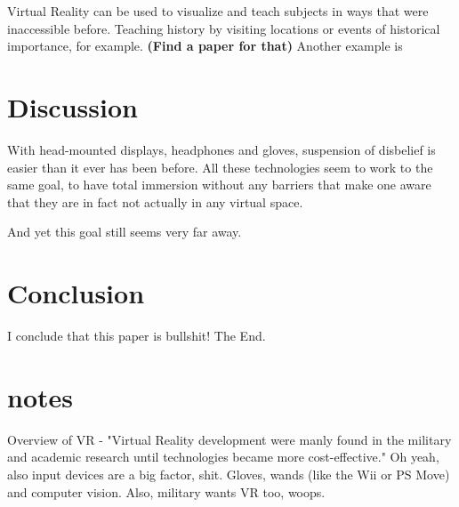 \documentclass[11pt]{article}
\begin{document}
	Virtual Reality can be used to visualize and teach subjects in ways that were inaccessible before. Teaching history by visiting locations or events of historical importance, for example. \textbf{(Find a paper for that)}
	Another example is 


	
	
	
	


\section{Discussion}
With head-mounted displays, headphones and gloves, suspension of disbelief is easier than it ever has been before. All these technologies seem to work to the same goal, to have total immersion without any barriers that make one aware that they are in fact not actually in any virtual space.

And yet this goal still seems very far away.


\section{Conclusion}
I conclude that this paper is bullshit! The End.




\section{notes}
Overview of VR - "Virtual Reality development were manly found in the military and academic research until technologies became more cost-effective."
Oh yeah, also input devices are a big factor, shit. Gloves, wands (like the Wii or PS Move) and computer vision.
Also, military wants VR too, woops.
	
\end{document}
